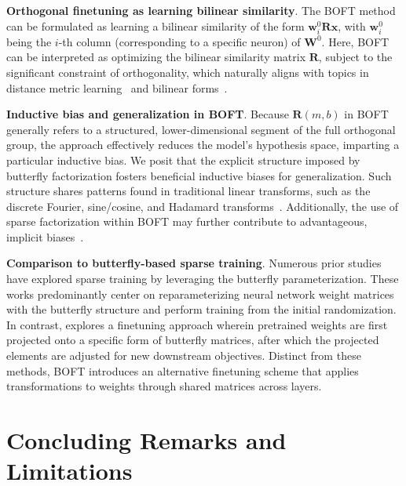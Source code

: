 \textbf{Orthogonal finetuning as learning bilinear similarity}. The BOFT method can be formulated as learning a bilinear similarity of the form $\bm{w}^0_i\bm{R}\bm{x}$, with $\bm{w}^0_i$ being the $i$-th column (corresponding to a specific neuron) of $\bm{W}^0$. Here, BOFT can be interpreted as optimizing the bilinear similarity matrix $\bm{R}$, subject to the significant constraint of orthogonality, which naturally aligns with topics in distance metric learning~\cite{xing2002distance} and bilinear forms~\cite{roman2005advanced}.

\textbf{Inductive bias and generalization in BOFT}. Because $\bm{R}(m,b)$ in BOFT generally refers to a structured, lower-dimensional segment of the full orthogonal group, the approach effectively reduces the model’s hypothesis space, imparting a particular inductive bias. We posit that the explicit structure imposed by butterfly factorization fosters beneficial inductive biases for generalization. Such structure shares patterns found in traditional linear transforms, such as the discrete Fourier, sine/cosine, and Hadamard transforms~\cite{dao2019kaleidoscope}. Additionally, the use of sparse factorization within BOFT may further contribute to advantageous, implicit biases~\cite{gunasekar2017implicit,li2018algorithmic,liu2019neural}.

\textbf{Comparison to butterfly-based sparse training}. Numerous prior studies~\cite{dao2019learning,dao2019kaleidoscope,chen2022pixelated,dao2022monarch} have explored sparse training by leveraging the butterfly parameterization. These works predominantly center on reparameterizing neural network weight matrices with the butterfly structure and perform training from the initial randomization. In contrast, \cite{dao2022monarch} explores a finetuning approach wherein pretrained weights are first projected onto a specific form of butterfly matrices, after which the projected elements are adjusted for new downstream objectives. Distinct from these methods, BOFT introduces an alternative finetuning scheme that applies transformations to weights through shared matrices across layers.



\section{Concluding Remarks and Limitations}

